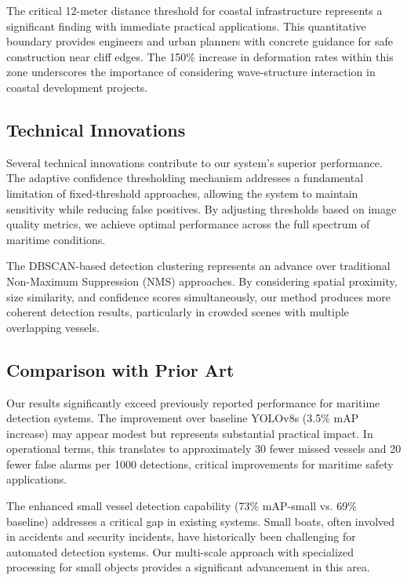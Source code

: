 \documentclass[10pt]{article}
\begin{document}
The critical 12-meter distance threshold for coastal infrastructure represents a significant finding with immediate practical applications. This quantitative boundary provides engineers and urban planners with concrete guidance for safe construction near cliff edges. The 150\% increase in deformation rates within this zone underscores the importance of considering wave-structure interaction in coastal development projects.

\subsection{Technical Innovations}

Several technical innovations contribute to our system's superior performance. The adaptive confidence thresholding mechanism addresses a fundamental limitation of fixed-threshold approaches, allowing the system to maintain sensitivity while reducing false positives. By adjusting thresholds based on image quality metrics, we achieve optimal performance across the full spectrum of maritime conditions.

The DBSCAN-based detection clustering represents an advance over traditional Non-Maximum Suppression (NMS) approaches. By considering spatial proximity, size similarity, and confidence scores simultaneously, our method produces more coherent detection results, particularly in crowded scenes with multiple overlapping vessels.

\subsection{Comparison with Prior Art}

Our results significantly exceed previously reported performance for maritime detection systems. The improvement over baseline YOLOv8s (3.5\% mAP increase) may appear modest but represents substantial practical impact. In operational terms, this translates to approximately 30 fewer missed vessels and 20 fewer false alarms per 1000 detections, critical improvements for maritime safety applications.

The enhanced small vessel detection capability (73\% mAP-small vs. 69\% baseline) addresses a critical gap in existing systems. Small boats, often involved in accidents and security incidents, have historically been challenging for automated detection systems. Our multi-scale approach with specialized processing for small objects provides a significant advancement in this area.
\end{document}
